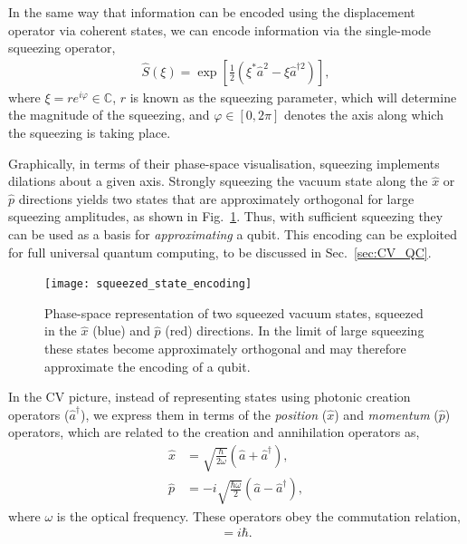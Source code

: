 In the same way that information can be encoded using the displacement operator via coherent states, we can encode information via the single-mode squeezing operator,
\begin{align}\label{eq:sq_op}
\hat{S}(\xi) = \exp\left[ \frac{1}{2}(\xi^*\hat{a}^2 - \xi{\hat{a}^{\dag 2}})\right],
\end{align}
where \mbox{$\xi  = r e^{i \varphi}\in \mathbb{C}$}, $r$ is known as the squeezing parameter, which will determine the magnitude of the squeezing, and \mbox{$\varphi \in [0, 2\pi]$} denotes the axis along which the squeezing is taking place.

Graphically, in terms of their phase-space visualisation, squeezing implements dilations about a given axis. Strongly squeezing the vacuum state along the $\hat{x}$ or $\hat{p}$ directions yields two states that are approximately orthogonal for large squeezing amplitudes, as shown in Fig.~\ref{fig:squeezed_state_encoding}. Thus, with sufficient squeezing they can be used as a basis for \textit{approximating} a qubit. This encoding can be exploited for full universal quantum computing, to be discussed in Sec.~\ref{sec:CV_QC}.

\begin{figure}[!htbp]
\texttt{[image: squeezed\_state\_encoding]}
\captionspacefig \caption{Phase-space representation of two squeezed vacuum states, squeezed in the $\hat{x}$ (blue) and $\hat{p}$ (red) directions. In the limit of large squeezing these states become approximately orthogonal and may therefore approximate the encoding of a qubit.} \label{fig:squeezed_state_encoding}	
\end{figure}

In the CV picture, instead of representing states using photonic creation operators ($\hat a^\dag$), we express them in terms of the \textit{position} ($\hat x$) and \textit{momentum} ($\hat p$) operators, which are related to the creation and annihilation operators as,
\begin{align}
\hat x &=    \sqrt{\frac{\hbar}{2 \omega}}(\hat a + \hat a^\dag), \nonumber \\
\hat p &= -i \sqrt{\frac{\hbar  \omega}{2}}(\hat a - \hat a^\dag), 
\end{align}
where $\omega$ is the optical frequency. These operators obey the commutation relation,
\begin{align}
[\hat x, \hat p] = i \hbar.
\end{align}

